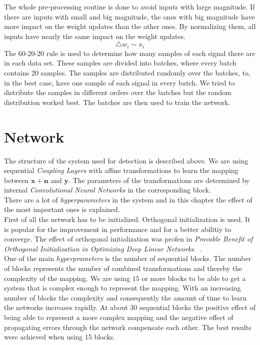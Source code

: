 \documentclass[oneside]{msvreport}%
\newcommand{\B}[1]{\boldsymbol{#1}}
\newcommand{\e}[1]{\emph{#1}}
\begin{document}
\noindent The whole pre-processing routine is done to avoid inputs with large magnitude. If there are inputs with small and big magnitude, the ones with big magnitude have more impact on the weight updates than the other ones. By normalizing them, all inputs have nearly the same impact on the weight updates.
\begin{equation}
  \triangle w_{i} \sim x_i
\end{equation}
The 60-20-20 rule is used to determine how many samples of each signal there are in each data set. These samples are divided into batches, where every batch contains 20 samples. The samples are distributed randomly over the batches, to, in the best case, have one sample of each signal in every batch. We tried to distribute the samples in different orders over the batches but the random distribution worked best. The batches are then used to train the network.

\newpage
\section{Network}
The structure of the system used for detection is described above. We are using sequential \emph{Coupling Layers} with affine transformations to learn the mapping between $\B{x} + \B{n}$ and $\B{y}$. The parameters of the transformations are determined by internal \emph{Convolutional Neural Networks} in the corresponding block.\\

\noindent There are a lot of \emph{hyperparameters} in the system and in this chapter the effect of the most important ones is explained. \\First of all the network has to be initialized. Orthogonal initialization is used. It is popular for the improvement in performance and for a better abilitiy to converge. The effect of orthogonal initialization was profen in \emph{Provable Benefit of Orthogonal Initialization in Optimizing Deep Linear Networks} ~\cite{hu2020provable}.\\

\noindent One of the main \e{hyperprameters} is the number of sequential blocks. The number of blocks represents the number of combined transformations and thereby the complexity of the mapping. We are using $15$ or more blocks to be able to get a system that is complex enough to represent the mapping. With an increasing number of blocks the complexity and consequently the amount of time to learn the networks increases rapidly. At about 30 sequential blocks the positive effect of being able to represent a more complex mapping and the negative effect of propagating errors through the network compensate each other. The best results were achieved when using 15 blocks.\\
\end{document}

